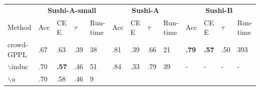 \begin{table}
\small
\begin{tabularx}{\textwidth}{| p{1.1cm} | X | X | X | p{0.55cm} | X | X | X | p{0.7cm} | X | X | X | p{0.7cm} |}
\hline
& \multicolumn{4}{c|}{\textbf{Sushi-A-small}} & \multicolumn{4}{c|}{\textbf{Sushi-A}} & \multicolumn{4}{c|}{\textbf{Sushi-B}} \\ 
Method & Acc & CE E & $\tau$ & Run-time & Acc & CE E & $\tau$ & Run-time & Acc & CE E & $\tau$ & Run-time \\
\hline\hline
\multicolumn{1}{|b{1.1cm}|}{crowd-GPPL} & .67 & .63 & .39 & 38%
& .81 & .39 & .66 & 21
& \textbf{.79} & \textbf{.57} & .50 & 393 \\
$\backslash $induc & .70 & \textbf{.57} & .46 & 51 %
& .84 & .33 & .79 & 39
& - & - & - & -
\\
$\backslash u$ & .70 & .58 & .46 & 9  &%


\end{tabularx}
\end{table}
